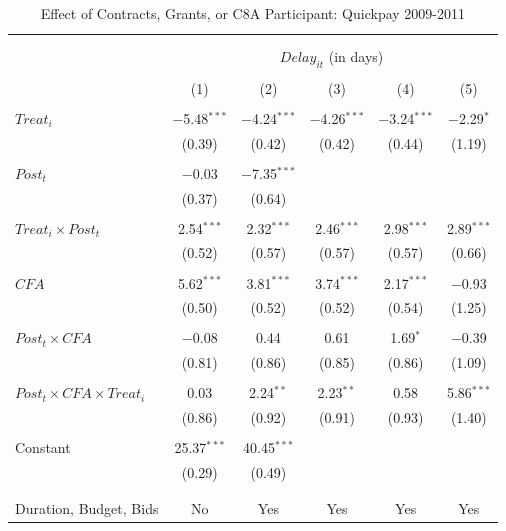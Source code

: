 \documentclass[]{article}
\begin{document}
\begin{table}[H] \centering 
  \caption{Effect of Contracts, Grants, or C8A Participant: Quickpay 2009-2011} 
  \label{} 
\small 
\begin{tabular}{@{\extracolsep{-2pt}}lccccc} 
\\[-1.8ex]\hline 
\hline \\[-1.8ex] 
\\[-1.8ex] & \multicolumn{5}{c}{$Delay_{it}$ (in days)} \\ 
\\[-1.8ex] & (1) & (2) & (3) & (4) & (5)\\ 
\hline \\[-1.8ex] 
 $Treat_i$ & $-$5.48$^{***}$ & $-$4.24$^{***}$ & $-$4.26$^{***}$ & $-$3.24$^{***}$ & $-$2.29$^{*}$ \\ 
  & (0.39) & (0.42) & (0.42) & (0.44) & (1.19) \\ 
  & & & & & \\ 
 $Post_t$ & $-$0.03 & $-$7.35$^{***}$ &  &  &  \\ 
  & (0.37) & (0.64) &  &  &  \\ 
  & & & & & \\ 
 $Treat_i \times Post_t$ & 2.54$^{***}$ & 2.32$^{***}$ & 2.46$^{***}$ & 2.98$^{***}$ & 2.89$^{***}$ \\ 
  & (0.52) & (0.57) & (0.57) & (0.57) & (0.66) \\ 
  & & & & & \\ 
 $CFA$ & 5.62$^{***}$ & 3.81$^{***}$ & 3.74$^{***}$ & 2.17$^{***}$ & $-$0.93 \\ 
  & (0.50) & (0.52) & (0.52) & (0.54) & (1.25) \\ 
  & & & & & \\ 
 $Post_t \times CFA$ & $-$0.08 & 0.44 & 0.61 & 1.69$^{*}$ & $-$0.39 \\ 
  & (0.81) & (0.86) & (0.85) & (0.86) & (1.09) \\ 
  & & & & & \\ 
 $Post_t \times CFA \times Treat_i$ & 0.03 & 2.24$^{**}$ & 2.23$^{**}$ & 0.58 & 5.86$^{***}$ \\ 
  & (0.86) & (0.92) & (0.91) & (0.93) & (1.40) \\ 
  & & & & & \\ 
 Constant & 25.37$^{***}$ & 40.45$^{***}$ &  &  &  \\ 
  & (0.29) & (0.49) &  &  &  \\ 
  & & & & & \\ 
\hline \\[-1.8ex] 
Duration, Budget, Bids & No & Yes & Yes & Yes & Yes \\ 

\end{tabular}
\end{table}
\end{document}
